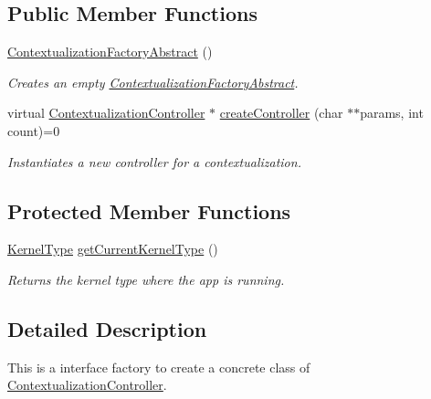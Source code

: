 \subsection*{Public Member Functions}
\begin{DoxyCompactItemize}
\item 
\mbox{\label{classContextualizationFactoryAbstract_a5f3886dc42bb68d69c5ed39e204d982c}} 
\mbox{\hyperlink{classContextualizationFactoryAbstract_a5f3886dc42bb68d69c5ed39e204d982c}{Contextualization\+Factory\+Abstract}} ()
\begin{DoxyCompactList}\small\item\em Creates an empty \mbox{\hyperlink{classContextualizationFactoryAbstract}{Contextualization\+Factory\+Abstract}}. \end{DoxyCompactList}\item 
virtual \mbox{\hyperlink{classContextualizationController}{Contextualization\+Controller}} $\ast$ \mbox{\hyperlink{classContextualizationFactoryAbstract_a0898ad4d3a109c5767a1e596bf444e4a}{create\+Controller}} (char $\ast$$\ast$params, int count)=0
\begin{DoxyCompactList}\small\item\em Instantiates a new controller for a contextualization. \end{DoxyCompactList}\end{DoxyCompactItemize}
\subsection*{Protected Member Functions}
\begin{DoxyCompactItemize}
\item 
\mbox{\hyperlink{classContextualizationFactoryAbstract_a87cd3e6ea2f582fe98286a73d3b28f60}{Kernel\+Type}} \mbox{\hyperlink{classContextualizationFactoryAbstract_a2d7958c0f68ad388f832abcb7777397d}{get\+Current\+Kernel\+Type}} ()
\begin{DoxyCompactList}\small\item\em Returns the kernel type where the app is running. \end{DoxyCompactList}\end{DoxyCompactItemize}


\subsection{Detailed Description}
This is a interface factory to create a concrete class of \mbox{\hyperlink{classContextualizationController}{Contextualization\+Controller}}. 

